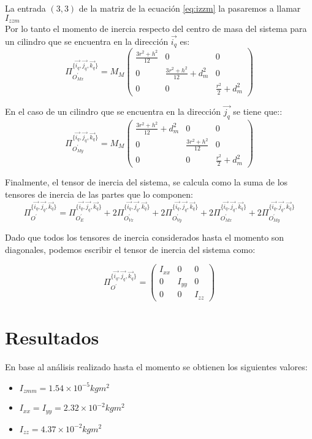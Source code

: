 \documentclass[main]{subfiles}
\begin{document}
La entrada $(3,3)$ de la matriz de la ecuación \ref{eq:izzm} la pasaremos a llamar $I_{zzm}$\\

Por lo tanto el momento de inercia respecto del centro de masa del sistema para un cilindro que se encuentra en la dirección $\vec{i_q}$ es:
\begin{equation}
\Pi_{O^{\prime}_{Mx}}^{\{\vec{i_q}, \vec{j_q}, \vec{k_q}\}}=M_M\left(\begin{array}{ccc}
\frac{3r^2+h^2}{12}  &0&  0\\
0  &\frac{3r^2+h^2}{12} +d_m^2& 0\\
0  &0 & \frac{r^2}{2}+d_m^2  
\end{array}\right)
\end{equation}


En el caso de un cilindro que se encuentra en la dirección $\vec{j_q}$ se tiene que::
\begin{equation}
\Pi_{O^{\prime}_{My}}^{\{\vec{i_q}, \vec{j_q}, \vec{k_q}\}}=M_M\left(\begin{array}{ccc}
\frac{3r^2+h^2}{12} +d_m^2 &0&  0\\
0  &\frac{3r^2+h^2}{12} & 0\\
0  &0 & \frac{r^2}{2}+d_m^2  
\end{array}\right)
\end{equation}


Finalmente, el tensor de inercia del sistema, se calcula como la suma de los tensores de inercia de las partes que lo componen:
\begin{equation}
\Pi_{O^{\prime}}^{\{\vec{i_q}, \vec{j_q}, \vec{k_q}\}} =\Pi_{O^{\prime}_E}^{\{\vec{i_q}, \vec{j_q}, \vec{k_q}\}} + 2 \Pi_{O^{\prime}_{Vx}}^{\{\vec{i_q}, \vec{j_q}, \vec{k_q}\}} + 2 \Pi_{O^{\prime}_{Vy}}^{\{\vec{i_q}, \vec{j_q}, \vec{k_q}\}} + 2 \Pi_{O^{\prime}_{Mx}}^{\{\vec{i_q}, \vec{j_q}, \vec{k_q}\}}+ 2 \Pi_{O^{\prime}_{My}}^{\{\vec{i_q}, \vec{j_q}, \vec{k_q}\}}
\end{equation}

Dado que todos los tensores de inercia considerados hasta el momento son diagonales, podemos escribir el tensor de inercia del sistema como:

\begin{equation}
\Pi_{O^{\prime}}^{\{\vec{i_q}, \vec{j_q}, \vec{k_q}\}}=\left(\begin{array}{ccc}
I_{xx}  &0&  0\\
0  &I_{yy}& 0\\
0  &0 & I_{zz}  
\end{array}\right)\end{equation}

\section{Resultados} 

En base al análisis realizado hasta el momento se obtienen los siguientes valores:

\begin{itemize}
\item $I_{zmm}=1.54\times10^{-5}kgm^2$
\item $I_{xx}=I_{yy}=2.32\times10^{-2}kgm^2$
\item $I_{zz}=4.37\times10^{-2}kgm^2$
\end{itemize}
\end{document}
